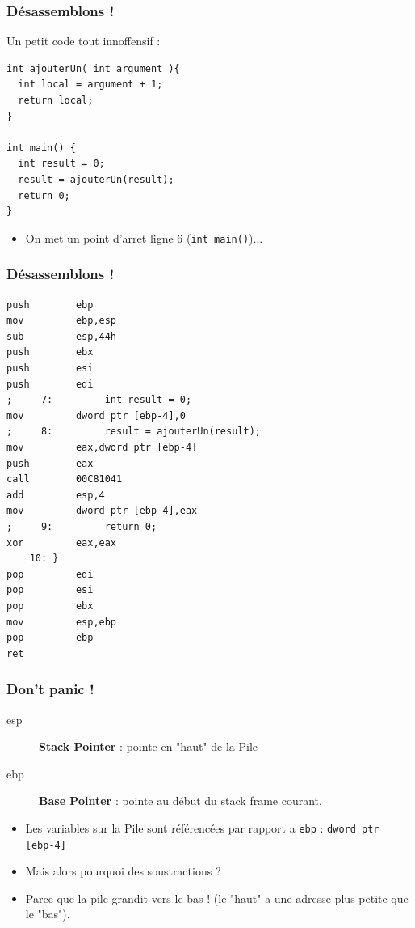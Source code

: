 \documentclass{beamer}
\begin{document}
\begin{frame}[fragile]
\frametitle{Désassemblons !}
Un petit code tout innoffensif :
\begin{lstlisting}
int ajouterUn( int argument ){
  int local = argument + 1;
  return local;
}

int main() {
  int result = 0;
  result = ajouterUn(result);
  return 0;
}
\end{lstlisting}
\begin{itemize}
\item On met un point d'arret ligne 6 (\lstinline+int main()+)...
\end{itemize}
\end{frame}

\begin{frame}[fragile]
\frametitle{Désassemblons !}
\begin{lstlisting}[language={[x86masm]Assembler}, basicstyle={\scriptsize\ttfamily}]
push        ebp  
mov         ebp,esp  
sub         esp,44h  
push        ebx  
push        esi  
push        edi  
;     7:         int result = 0;
mov         dword ptr [ebp-4],0  
;     8:         result = ajouterUn(result);
mov         eax,dword ptr [ebp-4]  
push        eax  
call        00C81041  
add         esp,4  
mov         dword ptr [ebp-4],eax  
;     9:         return 0;
xor         eax,eax  
    10: }
pop         edi  
pop         esi  
pop         ebx  
mov         esp,ebp  
pop         ebp  
ret  
\end{lstlisting}
\end{frame}
\begin{frame}[fragile]
\frametitle{Don't panic !}
\begin{description}
\item[esp]  \textbf{Stack Pointer} : pointe en "haut" de la Pile 
\item[ebp]  \textbf{Base Pointer} : pointe au début du stack frame courant.
\end{description}
\begin{itemize}
\item Les variables sur la Pile sont référencées par rapport a \texttt{ebp} : \lstinline[language={[x86masm]Assembler}]+dword ptr [ebp-4]+ 
\item Mais alors pourquoi des soustractions ?
\pause
\item Parce que la pile grandit vers le bas ! (le "haut" a une adresse plus petite que le "bas").
\end{itemize}
\end{frame}
\end{document}
